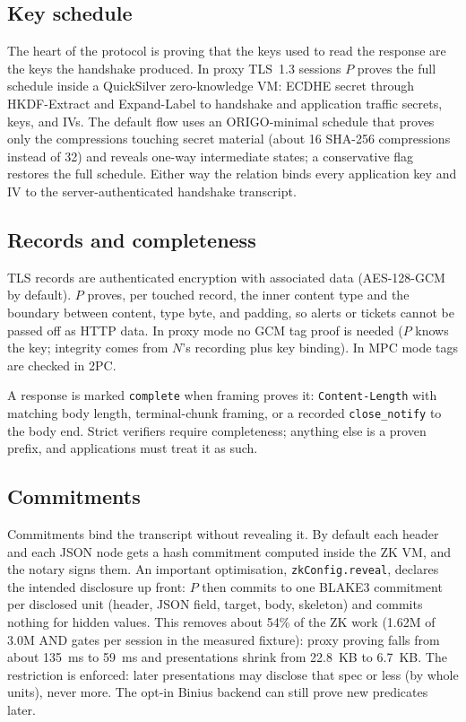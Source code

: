 \documentclass[11pt,a4paper]{article}
\begin{document}
\subsection{Key schedule}

The heart of the protocol is proving that the keys used to read the response
are the keys the handshake produced.
In proxy TLS~1.3 sessions $P$ proves the full schedule inside a QuickSilver
zero-knowledge VM: ECDHE secret through HKDF-Extract and Expand-Label to
handshake and application traffic secrets, keys, and IVs.
The default flow uses an ORIGO-minimal schedule that proves only the
compressions touching secret material (about 16 SHA-256 compressions instead
of 32) and reveals one-way intermediate states; a conservative flag restores
the full schedule.
Either way the relation binds every application key and IV to the
server-authenticated handshake transcript.

\subsection{Records and completeness}

TLS records are authenticated encryption with associated data
(AES-128-GCM by default).
$P$ proves, per touched record, the inner content type and the boundary
between content, type byte, and padding, so alerts or tickets cannot be passed
off as HTTP data.
In proxy mode no GCM tag proof is needed ($P$ knows the key; integrity comes
from $N$'s recording plus key binding). In MPC mode tags are checked in 2PC.

A response is marked \texttt{complete} when framing proves it:
\texttt{Content-Length} with matching body length, terminal-chunk framing, or
a recorded \texttt{close\_notify} to the body end.
Strict verifiers require completeness; anything else is a proven prefix, and
applications must treat it as such.

\subsection{Commitments}

Commitments bind the transcript without revealing it.
By default each header and each JSON node gets a hash commitment computed
inside the ZK VM, and the notary signs them.
An important optimisation, \texttt{zkConfig.reveal}, declares the intended
disclosure up front: $P$ then commits to one BLAKE3 commitment per disclosed
unit (header, JSON field, target, body, skeleton) and commits nothing for
hidden values.
This removes about 54\% of the ZK work (1.62M of 3.0M AND gates per session
in the measured fixture): proxy proving falls from about 135~ms to 59~ms and
presentations shrink from 22.8~KB to 6.7~KB.
The restriction is enforced: later presentations may disclose that spec or
less (by whole units), never more. The opt-in Binius backend can still prove
new predicates later.
\end{document}
